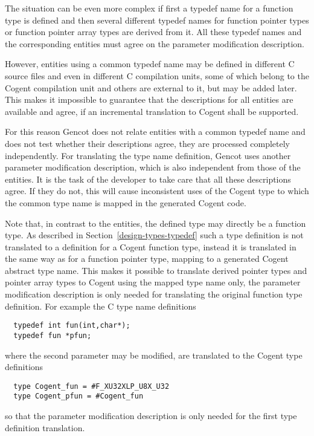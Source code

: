 The situation can be even more complex if first a typedef name for a function type is defined and then several
different typedef names for function pointer types or function pointer array types are derived from it. All
these typedef names and the corresponding entities must agree on the parameter modification description.

However, entities using a common typedef name may be defined in different C source files and even in different
C compilation units, some of which belong to the Cogent compilation unit and others are external to it, but may
be added later. This makes it impossible to guarantee that the descriptions for all entities are available
and agree, if an incremental translation to Cogent shall be supported.

For this reason Gencot does not relate entities with a common typedef name and does not test whether their
descriptions agree, they are processed completely independently. For translating the type name definition,
Gencot uses another parameter modification description, which is also independent from those of the entities.
It is the task of the developer to take care that all these descriptions agree. If they do not, this will 
cause inconsistent uses of the Cogent type to which the common type name is mapped in the generated Cogent code.

Note that, in contrast to the entities, the defined type may directly be a function type. As described in 
Section~\ref{design-types-typedef} such a type definition is not translated to a definition for a Cogent function
type, instead it is translated in the same way as for a function pointer type, mapping to a generated Cogent
abstract type name. This makes it possible to translate derived pointer types and pointer array types to 
Cogent using the mapped type name only, the parameter modification description is only needed for translating
the original function type definition. For example the C type name definitions
\begin{verbatim}
  typedef int fun(int,char*);
  typedef fun *pfun;
\end{verbatim}
where the second parameter may be modified, are translated to the Cogent type definitions
\begin{verbatim}
  type Cogent_fun = #F_XU32XLP_U8X_U32
  type Cogent_pfun = #Cogent_fun
\end{verbatim}
so that the parameter modification description is only needed for the first type definition translation.

